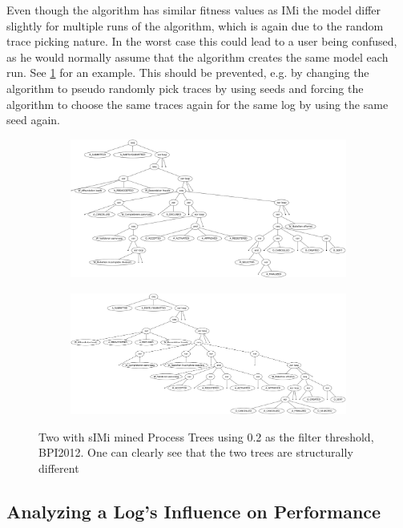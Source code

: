 \documentclass[
	a4paper,
	pagesize,
	pdftex,
	12pt,
	twoside, %
	BCOR=5mm, %
	ngerman,
	fleqn,
	final,
	]{scrartcl}
\begin{document}
Even though the algorithm has similar fitness values as IMi the model differ slightly for multiple runs of the algorithm, which is again due to the random trace picking nature.
In the worst case this could lead to a user being confused, as he would normally assume that the algorithm creates the same model each run. See \ref{fig:processTree12} for an example.
This should be prevented, e.g. by changing the algorithm to pseudo randomly pick traces by using seeds and forcing the algorithm to choose the same traces again for the same log by using the same seed again.
\begin{figure}[h]
\centering
	\begin{subfigure}{.7\textwidth}
	  \includegraphics[width=\linewidth]{data/process_tree_2.png}
	\end{subfigure}\vspace{0.5cm}
	\centering
	\begin{subfigure}{.7\textwidth}
	  \centering
	  \includegraphics[width=\linewidth]{data/process_tree_3.png}
	\end{subfigure}
	\caption{Two with sIMi mined Process Trees using 0.2 as the filter threshold, BPI2012. One can clearly see that the two trees are structurally different}
	\label{fig:processTree12}
\end{figure}
\subsection{Analyzing a Log's Influence on Performance}
\end{document}
